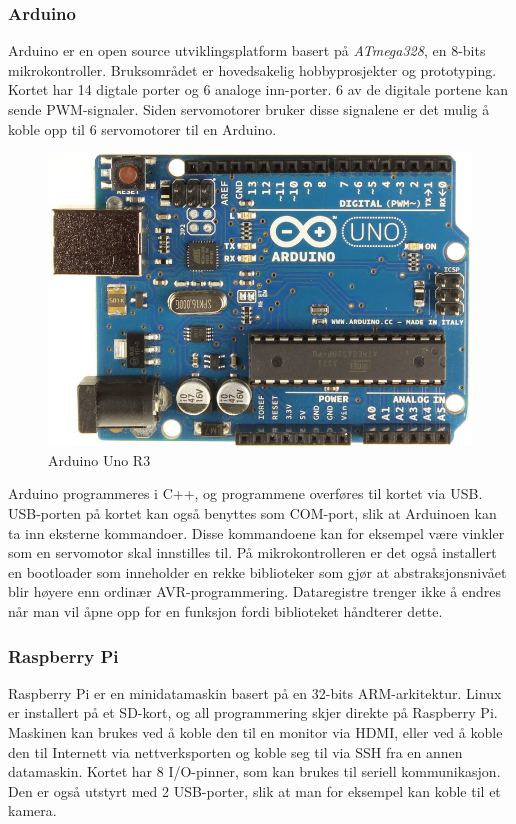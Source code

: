 \subsubsection{Arduino}
Arduino er en open source utviklingsplatform basert på \textit{ATmega328}, en 8-bits mikrokontroller. Bruksområdet er hovedsakelig hobbyprosjekter og prototyping. Kortet har 14 digtale porter og 6 analoge inn-porter. 6 av de digitale portene kan sende PWM-signaler. Siden servomotorer bruker disse signalene er det mulig å koble opp til 6 servomotorer til en Arduino.
%
\begin{figure}[h!]
\centering
\includegraphics[scale = 0.25]{img/arduinoBoard.jpg}
\caption{Arduino Uno R3}
\end{figure}
%
Arduino programmeres i C++, og programmene overføres til kortet via USB. USB-porten på kortet kan også benyttes som COM-port, slik at Arduinoen kan ta inn eksterne kommandoer. Disse kommandoene kan for eksempel være vinkler som en servomotor skal innstilles til. På mikrokontrolleren er det også installert en bootloader som inneholder en rekke biblioteker som gjør at abstraksjonsnivået blir høyere enn ordinær AVR-programmering. Dataregistre trenger ikke å endres når man vil åpne opp for en funksjon fordi biblioteket håndterer dette.

\subsubsection{Raspberry Pi}
Raspberry Pi er en minidatamaskin basert på en 32-bits ARM-arkitektur. Linux er installert på et SD-kort, og all programmering skjer direkte på Raspberry Pi. Maskinen kan brukes ved å koble den til en monitor via HDMI, eller ved å koble den til Internett via nettverksporten og koble seg til via SSH fra en annen datamaskin. Kortet har 8 I/O-pinner, som kan brukes til seriell kommunikasjon. Den er også utstyrt med 2 USB-porter, slik at man for eksempel kan koble til et kamera. 


